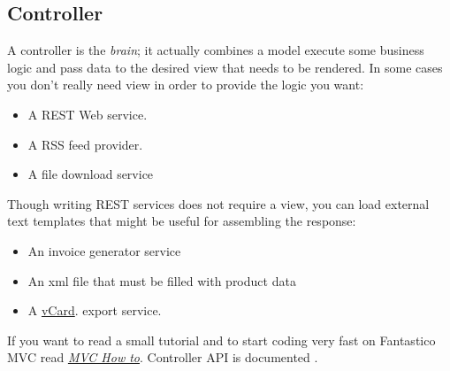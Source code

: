 \documentclass[letterpaper,10pt,english]{sphinxmanual}
\begin{document}
\subsection{Controller}
\label{features/mvc:controller}\label{features/mvc:core-controller-section}
A controller is the \emph{brain}; it actually combines a model execute some business logic and pass data to the desired view
that needs to be rendered. In some cases you don't really need view in order to provide the logic you want:
\begin{itemize}
\item {} 
A REST Web service.

\item {} 
A RSS feed provider.

\item {} 
A file download service

\end{itemize}

Though writing REST services does not require a view, you can load external text templates that might be useful for assembling the
response:
\begin{itemize}
\item {} 
An invoice generator service

\item {} 
An xml file that must be filled with product data

\item {} 
A \href{http://en.wikipedia.org/wiki/VCard}{vCard}. export service.

\end{itemize}

If you want to read a small tutorial and to start coding very fast on Fantastico MVC read {\hyperref[how_to/mvc_how_to::doc]{\emph{MVC How to}}}. Controller
API is documented .
\end{document}
